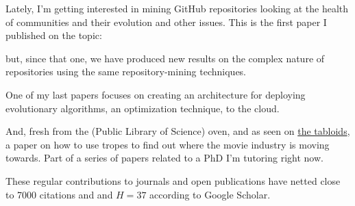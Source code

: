 \documentclass[]{friggeri-jj-cv}
\begin{document}
\cite{2014arXiv1403.3084G}

Lately, I'm getting interested in mining GitHub repositories looking
at the health of communities and their evolution and other
issues. This is the first paper I published on the topic:

\cite{2016arXiv160107862M}

but, since that one, we have produced new results on the complex
nature of repositories using the same repository-mining techniques.

One of my last papers focuses on creating an architecture for
deploying evolutionary algorithms, an optimization technique, to the
cloud.

\cite{GARCIAVALDEZ2021234}

And, fresh from the (Public Library of Science) oven, and as seen on
\href{https://www.dailymail.co.uk/sciencetech/article-9423885/COMPUTERS-soon-write-film-scripts-analysing-popular-movie-tropes.html}{the
  tabloids}, a paper on how to use tropes to find out where the movie
industry is moving towards. Part of a series of papers related to a
PhD I'm tutoring right now.

\cite{10.1371/journal.pone.0248881}

These regular contributions to journals and open publications have
netted close to 7000 citations and and $H=37$ according to Google Scholar.

\end{document}
